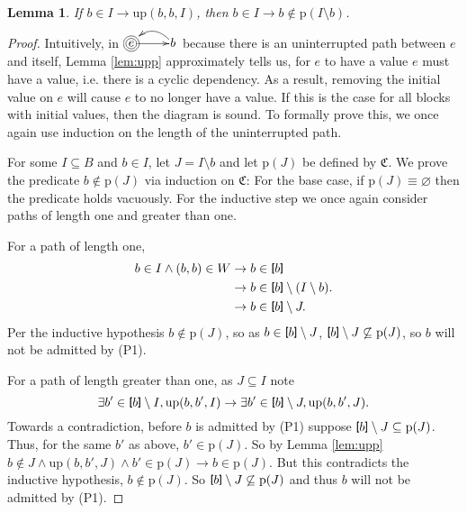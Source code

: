 \documentclass[twocolumn]{article}
\newtheorem{lemma}{Lemma}
\newcommand{\TightBracketB}[1]{\raisebox{0.25ex}{\scalebox{0.8}{\boldmath${#1\kern-0.65ex#1}$}}}%
\newcommand*{\Inputs}[1]{\TightBracketB[#1\TightBracketB]}
\begin{document}
\begin{lemma} \label{lem:soundness}
    If $b\in I \rightarrow \text{up}(b, b, I)$, then $b\in I\rightarrow b\not\in\text{p}(I\setminus b)$.
\end{lemma}
\begin{proof}
    Intuitively, in $\xymatrix@1{*++++[o][F=]{e} \ar[r] & b \ar@/_1em/[l]}$ because there is an uninterrupted path between $e$ and itself, Lemma \ref{lem:upp} approximately tells us, for $e$ to have a value $e$ must have a value, i.e. there is a cyclic dependency. As a result, removing the initial value on $e$ will cause $e$ to no longer have a value. If this is the case for all blocks with initial values, then the diagram is sound. To formally prove this, we once again use induction on the length of the uninterrupted path.

        For some $I\subseteq B$ and $b\in I$, let $J=I\setminus b$ and let $\text{p}(J)$ be defined by $\mathfrak{C}$. We prove the predicate $b\not\in\text{p}(J)$ via induction on $\mathfrak{C}$: For the base case, if $\text{p}(J)\equiv\varnothing$ then the predicate holds vacuously. For the inductive step we once again consider paths of length one and greater than one.

        For a path of length one,
        \[
        \begin{aligned}
            b\in I\land (b, b)\in W &\rightarrow b\in \Inputs{b} \\
            &\rightarrow b\in\Inputs{b}\setminus (I\setminus b). \\
            &\rightarrow b\in\Inputs{b}\setminus J.
        \end{aligned}
        \]
        Per the inductive hypothesis $b\not\in\text{p}(J)$, so as $b\in \Inputs{b}\setminus J$, $\Inputs{b}\setminus J\not\subseteq\text{p}(J)$, so $b$ will not be admitted by (P1).

        For a path of length greater than one, as $J\subseteq I$ note
        \[
            \exists b'\in\Inputs{b}\setminus I, \text{up}(b, b', I)
            \rightarrow \exists b'\in\Inputs{b}\setminus J, \text{up}(b, b', J).
        \]
        Towards a contradiction, before $b$ is admitted by (P1) suppose $\Inputs{b}\setminus J \subseteq \text{p}(J)$. Thus, for the same $b'$ as above, $b'\in\text{p}(J)$. So by Lemma \ref{lem:upp} $b\not\in J\land \text{up}(b, b', J) \land b'\in\text{p}(J) \rightarrow b\in \text{p}(J)$. But this contradicts the inductive hypothesis, $b\not\in\text{p}(J)$. So $\Inputs{b}\setminus J \not\subseteq \text{p}(J)$ and thus $b$ will not be admitted by (P1).
\end{proof}
\end{document}
